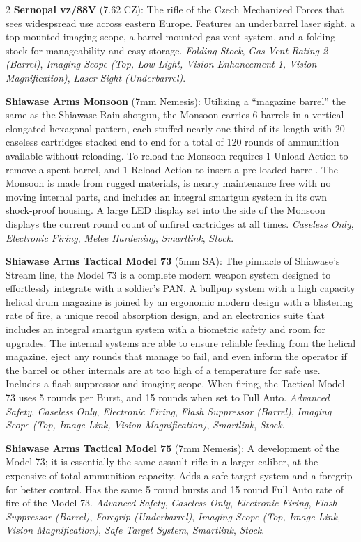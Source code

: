 \documentclass[
  oneside]{article}
\begin{document}
\begin{multicols}{2}
\textbf{Sernopal vz/88V} (7.62 CZ): The rifle of
the Czech Mechanized Forces that sees widespsread
use across eastern Europe. Features an underbarrel
laser sight, a top-mounted imaging scope, a
barrel-mounted gas vent system, and a folding
stock for manageability and easy storage.
\emph{Folding Stock}, \emph{Gas Vent Rating 2
(Barrel)}, \emph{Imaging Scope (Top, Low-Light,
Vision Enhancement 1, Vision Magnification)},
\emph{Laser Sight (Underbarrel)}.

\textbf{Shiawase Arms Monsoon} (7mm Nemesis):
Utilizing a ``magazine barrel'' the same as the
Shiawase Rain shotgun, the Monsoon carries 6
barrels in a vertical elongated hexagonal pattern,
each stuffed nearly one third of its length with
20 caseless cartridges stacked end to end for a
total of 120 rounds of ammunition available
without reloading. To reload the Monsoon requires
1 Unload Action to remove a spent barrel, and 1
Reload Action to insert a pre-loaded barrel. The
Monsoon is made from rugged materials, is nearly
maintenance free with no moving internal parts,
and includes an integral smartgun system in its
own shock-proof housing. A large LED display set
into the side of the Monsoon displays the current
round count of unfired cartridges at all times.
\emph{Caseless Only}, \emph{Electronic Firing},
\emph{Melee Hardening}, \emph{Smartlink},
\emph{Stock}.

\textbf{Shiawase Arms Tactical Model 73} (5mm SA):
The pinnacle of Shiawase's Stream line, the Model
73 is a complete modern weapon system designed to
effortlessly integrate with a soldier's PAN. A
bullpup system with a high capacity helical drum
magazine is joined by an ergonomic modern design
with a blistering rate of fire, a unique recoil
absorption design, and an electronics suite that
includes an integral smartgun system with a
biometric safety and room for upgrades. The
internal systems are able to ensure reliable
feeding from the helical magazine, eject any
rounds that manage to fail, and even inform the
operator if the barrel or other internals are at
too high of a temperature for safe use. Includes a
flash suppressor and imaging scope. When firing,
the Tactical Model 73 uses 5 rounds per Burst, and
15 rounds when set to Full Auto. \emph{Advanced
Safety}, \emph{Caseless Only}, \emph{Electronic
Firing}, \emph{Flash Suppressor (Barrel)},
\emph{Imaging Scope (Top, Image Link, Vision
Magnification)}, \emph{Smartlink}, \emph{Stock}.

\textbf{Shiawase Arms Tactical Model 75} (7mm
Nemesis): A development of the Model 73; it is
essentially the same assault rifle in a larger
caliber, at the expensive of total ammunition
capacity. Adds a safe target system and a foregrip
for better control. Has the same 5 round bursts
and 15 round Full Auto rate of fire of the Model
73. \emph{Advanced Safety}, \emph{Caseless Only},
\emph{Electronic Firing}, \emph{Flash Suppressor
(Barrel)}, \emph{Foregrip (Underbarrel)},
\emph{Imaging Scope (Top, Image Link, Vision
Magnification)}, \emph{Safe Target System},
\emph{Smartlink}, \emph{Stock}.


\end{multicols}
\end{document}
